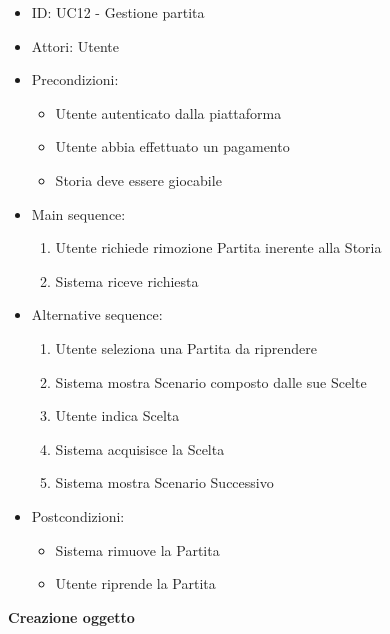 \documentclass{article}
\begin{document}
\begin{itemize}[label = { }]
    \itemsep0px
    \item ID: UC12 - Gestione partita
    \item Attori: Utente
    \item Precondizioni: 
        \begin{itemize}[label = {-}]
            \item Utente autenticato dalla piattaforma
            \item Utente abbia effettuato un pagamento
            \item Storia deve essere giocabile
        \end{itemize}
    \item Main sequence: 
        \begin{enumerate}
            \item Utente richiede rimozione Partita inerente alla Storia
            \item Sistema riceve richiesta
        \end{enumerate}
    \item Alternative sequence:
        \begin{enumerate}
            \item Utente seleziona una Partita da riprendere
            \item Sistema mostra Scenario composto dalle sue Scelte
            \item Utente indica Scelta
            \item Sistema acquisisce la Scelta
            \item Sistema mostra Scenario Successivo
        \end{enumerate}
    \item Postcondizioni: 
        \begin{itemize}[label = {-}]
            \item Sistema rimuove la Partita
            \item Utente riprende la Partita
        \end{itemize}
\end{itemize}
\textbf{Creazione oggetto}
\end{document}
